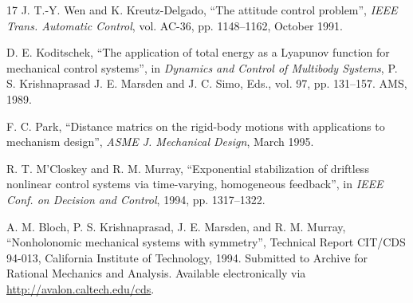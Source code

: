 \documentclass[10pt,twocolumn]{article}
\begin{document}
\begin{thebibliography}{17}
 J. T.-Y. Wen and K. Kreutz-Delgado, ``The attitude control problem'', \emph{IEEE Trans. Automatic Control}, vol. AC-36, pp. 1148--1162, October 1991.

 D. E. Koditschek, ``The application of total energy as a Lyapunov function for mechanical control systems'', in \emph{Dynamics and Control of Multibody Systems}, P. S. Krishnaprasad J. E. Marsden and J. C. Simo, Eds., vol. 97, pp. 131--157. AMS, 1989.

 F. C. Park, ``Distance matrics on the rigid-body motions with applications to mechanism design'', \emph{ASME J. Mechanical Design}, March 1995.

 R. T. M'Closkey and R. M. Murray, ``Exponential stabilization of driftless nonlinear control systems via time-varying, homogeneous feedback'', in \emph{IEEE Conf. on Decision and Control}, 1994, pp. 1317--1322.

 A. M. Bloch, P. S. Krishnaprasad, J. E. Marsden, and R. M. Murray, ``Nonholonomic mechanical systems with symmetry'', Technical Report CIT/CDS 94-013, California Institute of Technology, 1994. Submitted to Archive for Rational Mechanics and Analysis. Available electronically via \url{http://avalon.caltech.edu/cds}.
\end{thebibliography}
\end{document}
